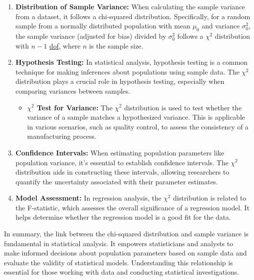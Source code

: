 \documentclass[
  a4paper,
]{scrbook}
\providecommand{\tightlist}{%
  \setlength{\itemsep}{0pt}\setlength{\parskip}{0pt}}\usepackage{longtable,booktabs,array}
\begin{document}
\begin{enumerate}
\def\labelenumi{\arabic{enumi}.}
\item
  \textbf{Distribution of Sample Variance:} When calculating the sample
  variance from a dataset, it follows a chi-squared distribution.
  Specifically, for a random sample from a normally distributed
  population with mean \hyperref[truemean-gloss]{\(\mu_0\)} and variance
  \hyperref[truevariance-gloss]{\(\sigma_0^2\)}, the sample variance
  (adjusted for bias) divided by
  \hyperref[truevariance-gloss]{\(\sigma_0^2\)} follows a \(\chi^2\)
  distribution with \(n-1\) \hyperref[acronyms_dof]{dof}, where \(n\) is
  the sample size.
\item
  \textbf{Hypothesis Testing:} In statistical analysis, hypothesis
  testing is a common technique for making inferences about populations
  using sample data. The \(\chi^2\) distribution plays a crucial role in
  hypothesis testing, especially when comparing variances between
  samples.

  \begin{itemize}
  \tightlist
  \item
    \textbf{\(\chi^2\) Test for Variance:} The \(\chi^2\) distribution
    is used to test whether the variance of a sample matches a
    hypothesized variance. This is applicable in various scenarios, such
    as quality control, to assess the consistency of a manufacturing
    process.
  \end{itemize}
\item
  \textbf{Confidence Intervals:} When estimating population parameters
  like population variance, it's essential to establish confidence
  intervals. The \(\chi^2\) distribution aids in constructing these
  intervals, allowing researchers to quantify the uncertainty associated
  with their parameter estimates.
\item
  \textbf{Model Assessment:} In regression analysis, the \(\chi^2\)
  distribution is related to the F-statistic, which assesses the overall
  significance of a regression model. It helps determine whether the
  regression model is a good fit for the data.
\end{enumerate}

In summary, the link between the chi-squared distribution and sample
variance is fundamental in statistical analysis. It empowers
statisticians and analysts to make informed decisions about population
parameters based on sample data and evaluate the validity of statistical
models. Understanding this relationship is essential for those working
with data and conducting statistical investigations.
\end{document}
